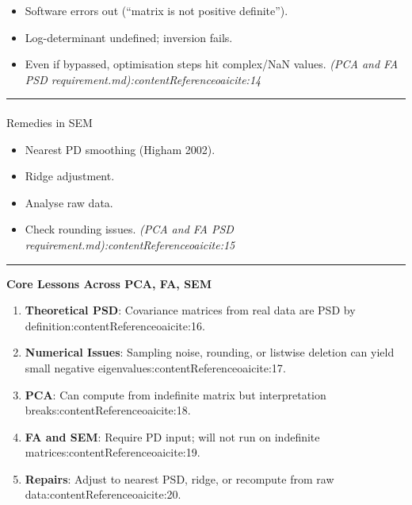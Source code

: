 \documentclass[
  12pt,
]{article}
\makeatletter
\let\oldparagraph\paragraph
\renewcommand{\paragraph}{
    \@ifstar
      \xxxParagraphStar
      \xxxParagraphNoStar
  }
\newcommand{\xxxParagraphStar}[1]{\oldparagraph*{#1}\mbox{}}
\newcommand{\xxxParagraphNoStar}[1]{\oldparagraph{#1}\mbox{}}
\providecommand{\tightlist}{%
  \setlength{\itemsep}{0pt}\setlength{\parskip}{0pt}}
\theoremstyle{plain}
\theoremstyle{definition}
\theoremstyle{remark}
\makeatother
\begin{document}
\begin{itemize}
\tightlist
\item
  Software errors out (``matrix is not positive definite'').
\item
  Log-determinant undefined; inversion fails.
\item
  Even if bypassed, optimisation steps hit complex/NaN values.
  \emph{(PCA and FA PSD requirement.md):contentReference{oaicite:14}}
\end{itemize}

\begin{center}\rule{0.5\linewidth}{0.5pt}\end{center}

\paragraph{Remedies in SEM}\label{remedies-in-sem}

\begin{itemize}
\tightlist
\item
  Nearest PD smoothing (Higham 2002).
\item
  Ridge adjustment.
\item
  Analyse raw data.
\item
  Check rounding issues. \emph{(PCA and FA PSD
  requirement.md):contentReference{oaicite:15}}
\end{itemize}

\begin{center}\rule{0.5\linewidth}{0.5pt}\end{center}

\textbf{Core Lessons Across PCA, FA, SEM}

\begin{enumerate}
\def\labelenumi{\arabic{enumi}.}
\tightlist
\item
  \textbf{Theoretical PSD}: Covariance matrices from real data are PSD
  by definition:contentReference{oaicite:16}.
\item
  \textbf{Numerical Issues}: Sampling noise, rounding, or listwise
  deletion can yield small negative
  eigenvalues:contentReference{oaicite:17}.
\item
  \textbf{PCA}: Can compute from indefinite matrix but interpretation
  breaks:contentReference{oaicite:18}.
\item
  \textbf{FA and SEM}: Require PD input; will not run on indefinite
  matrices:contentReference{oaicite:19}.
\item
  \textbf{Repairs}: Adjust to nearest PSD, ridge, or recompute from raw
  data:contentReference{oaicite:20}.
\end{enumerate}
\end{document}
